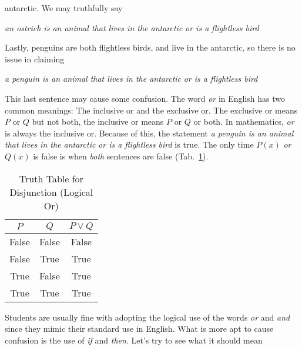             antarctic. We may truthfully say
            \begin{center}
                \textit{an ostrich is an animal that lives in the antarctic}
                \textit{or is a flightless bird}
            \end{center}
            Lastly, penguins are both flightless birds, and live in the
            antarctic, so there is no issue in claiming
            \begin{center}
                \textit{a penguin is an animal that lives in the antarctic}
                \textit{or is a flightless bird}
            \end{center}
            This last sentence may cause some confusion. The word
            \textit{or} in English has two common meanings: The inclusive
            or and the exclusive or.
            The exclusive or means $P$ or $Q$ but not
            both, the inclusive or means $P$ or $Q$ or both. In mathematics,
            \textit{or} is always the inclusive or. Because of this, the
            statement 
            \textit{a penguin is an animal that lives in the antarctic}
            \textit{or is a flightless bird} is true.
            The only time $P(x)$ \textit{or} $Q(x)$ is false is when
            \textit{both} sentences are false
            (Tab.~\ref{tab:truth_table_disjunction}).
            \begin{table}[H]
                \centering
                \begin{tabular}{c | c | c}
                    $P$&$Q$&$P\lor{Q}$\\
                    \hline
                    False&False&False\\
                    \hline
                    False&True&True\\
                    \hline
                    True&False&True\\
                    \hline
                    True&True&True
                \end{tabular}
                \caption{Truth Table for Disjunction (Logical Or)}
                \label{tab:truth_table_disjunction}
            \end{table}
            Students are usually fine with adopting the logical use of the
            words \textit{or} and \textit{and} since they mimic their standard
            use in English. What is more apt to cause confusion is the use of
            \textit{if} and \textit{then}. Let's try to see what it should mean
